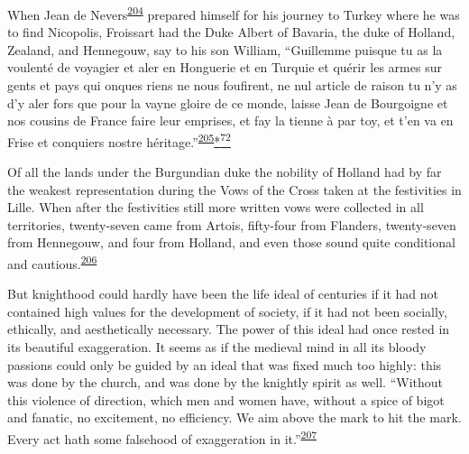 When Jean de
Nevers\textsuperscript{\protect\hypertarget{10_Chapter_Three__THE_HEROIC_DREAM.xhtmlux5cux23id_1529}{\protect\hyperlink{23_NOTES.xhtmlux5cux23id_1530}{204}}}
prepared himself for his journey to Turkey where he was to find
Nicopolis, Froissart had the Duke Albert of Bavaria, the duke of
Holland, Zealand, and Hennegouw, say to his son William, ``Guillemme
puisque tu as la voulenté de voyagier et aler en Honguerie et en Turquie
et quérir les armes sur gents et pays qui onques riens ne nous
foufirent, ne nul article de raison tu n'y as d'y aler fors que pour la
vayne gloire de ce monde, laisse Jean de Bourgoigne et nos cousins de
France faire leur emprises,
\protect\hypertarget{10_Chapter_Three__THE_HEROIC_DREAM.xhtmlux5cux23page_119}{}{}et
fay la tienne à par toy, et t'en va en Frise et conquiers nostre
héritage.''\textsuperscript{\protect\hypertarget{10_Chapter_Three__THE_HEROIC_DREAM.xhtmlux5cux23id_1527}{\protect\hyperlink{23_NOTES.xhtmlux5cux23id_1528}{205}}}\protect\hypertarget{10_Chapter_Three__THE_HEROIC_DREAM.xhtmlux5cux23id_3083}{\protect\hyperlink{23_NOTES.xhtmlux5cux23id_3084}{*\textsuperscript{72}}}

Of all the lands under the Burgundian duke the nobility of Holland had
by far the weakest representation during the Vows of the Cross taken at
the festivities in Lille. When after the festivities still more written
vows were collected in all territories, twenty-seven came from Artois,
fifty-four from Flanders, twenty-seven from Hennegouw, and four from
Holland, and even those sound quite conditional and
cautious.\textsuperscript{\protect\hypertarget{10_Chapter_Three__THE_HEROIC_DREAM.xhtmlux5cux23id_1525}{\protect\hyperlink{23_NOTES.xhtmlux5cux23id_1526}{206}}}

But knighthood could hardly have been the life ideal of centuries if it
had not contained high values for the development of society, if it had
not been socially, ethically, and aesthetically necessary. The power of
this ideal had once rested in its beautiful exaggeration. It seems as if
the medieval mind in all its bloody passions could only be guided by an
ideal that was fixed much too highly: this was done by the church, and
was done by the knightly spirit as well. ``Without this violence of
direction, which men and women have, without a spice of bigot and
fanatic, no excitement, no efficiency. We aim above the mark to hit the
mark. Every act hath some falsehood of exaggeration in
it.''\textsuperscript{\protect\hypertarget{10_Chapter_Three__THE_HEROIC_DREAM.xhtmlux5cux23id_1523}{\protect\hyperlink{23_NOTES.xhtmlux5cux23id_1524}{207}}}

